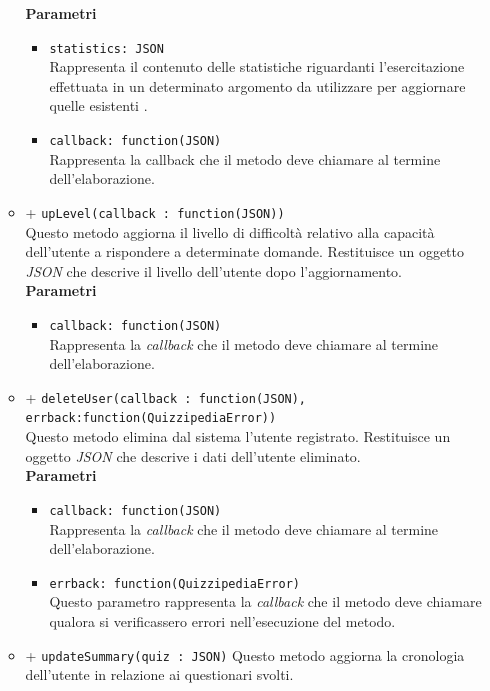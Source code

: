 \begin{itemize}
\begin{itemize}
		\textbf{Parametri} 
			\begin{itemize}
			\item
				\texttt{statistics: JSON} \\
				Rappresenta il contenuto delle statistiche riguardanti l'esercitazione effettuata in un determinato argomento da utilizzare per aggiornare quelle esistenti .
			\item	
				\texttt{callback: function(JSON)} \\
				Rappresenta la callback che il metodo deve chiamare al termine dell'elaborazione.
			\end{itemize}
		\item		
		+ \texttt{upLevel(callback : function(JSON))} \\
		Questo metodo aggiorna il livello di difficoltà relativo alla capacità dell'utente a rispondere a determinate domande. Restituisce un oggetto \textit{JSON} che descrive il livello dell'utente dopo l'aggiornamento.	\\	
		\textbf{Parametri} 
			\begin{itemize}
			\item	
				\texttt{callback: function(JSON)} \\
				Rappresenta la \textit{callback} che il metodo deve chiamare al termine dell'elaborazione.		
			\end{itemize}
		\item		
		+ \texttt{deleteUser(callback : function(JSON), errback:function(QuizzipediaError))} \\	
		Questo metodo elimina dal sistema l'utente registrato. Restituisce un oggetto \textit{JSON} che descrive i dati dell'utente eliminato.	\\	
		\textbf{Parametri} 
			\begin{itemize}
			\item	
				\texttt{callback: function(JSON)} \\
				Rappresenta la \textit{callback} che il metodo deve chiamare al termine dell'elaborazione.	
			\item	
				\texttt{errback: function(QuizzipediaError)} \\
				Questo parametro rappresenta la \textit{callback} che il metodo deve chiamare qualora si verificassero errori nell'esecuzione del metodo.		
			\end{itemize}
		\item	
		+ \texttt{updateSummary(quiz : JSON)}	
		Questo metodo aggiorna la cronologia dell'utente in relazione ai questionari svolti.\\	

\end{itemize}
\end{itemize}
